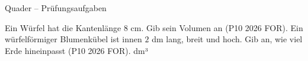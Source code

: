\begin{aufgabe}{Quader – Prüfungsaufgaben}
\begin{teile}
\teil Ein Würfel hat die Kantenlänge $8$ cm. Gib sein Volumen an \hfill (P10 2026 FOR). \leerfeld[cm³]
\teil Ein würfelförmiger Blumenkübel ist innen $2$ dm lang, breit und hoch. Gib an, wie viel Erde hineinpasst \hfill (P10 2026 FOR). \leerfeld dm³
\end{teile}
\end{aufgabe}
